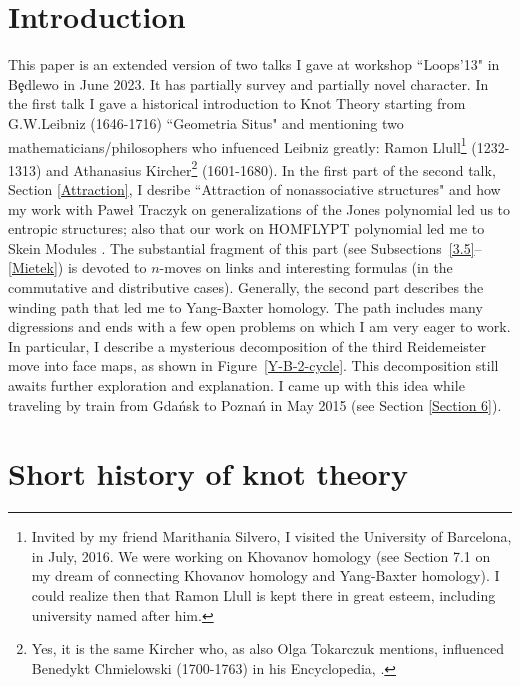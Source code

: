 \documentclass[12pt]{amsart}
\begin{document}
\section{Introduction}
This paper is an extended version of two talks I gave at workshop ``Loops'13" in B{\c e}dlewo in June 2023. It has partially survey and partially novel character. 
In the first talk I gave a historical introduction to Knot Theory starting from G.W.Leibniz (1646-1716) ``Geometria Situs" and mentioning two mathematicians/philosophers who infuenced Leibniz greatly: Ramon Llull\footnote{Invited by my friend Marithania Silvero, I visited the University of Barcelona, in July, 2016. We were working on Khovanov homology \cite{PrSi1,PrSi2} (see Section 7.1 on my dream of connecting Khovanov homology and Yang-Baxter homology). I could realize then that Ramon Llull is kept there in great esteem, including university named after him.} (1232-1313) and Athanasius Kircher\footnote{Yes, it is the same Kircher who, as also Olga Tokarczuk mentions, influenced  Benedykt Chmielowski (1700-1763) in his Encyclopedia, \cite{Tok}.} (1601-1680). In the first part of the second talk, Section \ref{Attraction}, I desribe  ``Attraction of nonassociative structures" and how my work with Pawe{\l} Traczyk on generalizations of the Jones polynomial \cite{Jon2,PT1} led us to entropic structures; also that our work on HOMFLYPT polynomial led me to Skein Modules \cite{Prz2}. The substantial fragment of this part (see Subsections~\ref{3.5}--\ref{Mietek}) is devoted to $n$-moves on links and interesting formulas (in the commutative and distributive cases). Generally, the second part describes the winding path that led me to Yang-Baxter homology. The path includes many digressions and ends with a few open problems on which I am very eager to work.
In particular, I describe a mysterious decomposition of the third Reidemeister move into face maps, as shown in Figure~\ref{Y-B-2-cycle}. This decomposition still awaits further exploration and explanation. I came up with this idea while traveling by train from Gda\'{n}sk to Pozna\'{n} in May 2015 (see Section \ref{Section 6}).

\section{Short history of knot theory}
\end{document}
